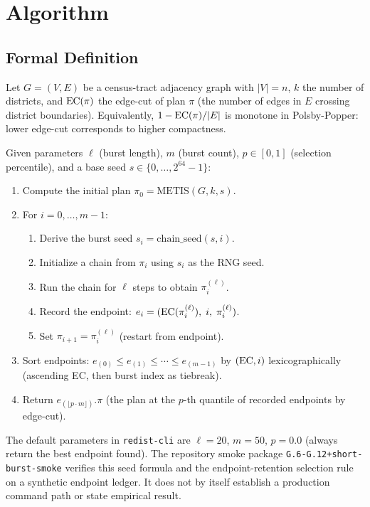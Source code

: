 \section{Algorithm}
\label{sec:algorithm}

\subsection{Formal Definition}

Let $G = (V, E)$ be a census-tract adjacency graph with $|V| = n$,
$k$ the number of districts, and $\mathrm{EC}(\pi)$ the edge-cut of plan $\pi$
(the number of edges in $E$ crossing district boundaries).
Equivalently, $1 - \mathrm{EC}(\pi)/|E|$ is monotone in Polsby-Popper: lower
edge-cut corresponds to higher compactness.

\begin{definition}[\shb{}]
\label{def:short-burst}
Given parameters $\ell$ (burst length), $m$ (burst count), $p \in [0, 1]$
(selection percentile), and a base seed $s \in \{0, \ldots, 2^{64}-1\}$:
\begin{enumerate}
\item Compute the initial plan $\pi_0 = \mathrm{METIS}(G, k, s)$.
\item For $i = 0, \ldots, m-1$:
  \begin{enumerate}
  \item Derive the burst seed $s_i = \mathrm{chain\_seed}(s, i)$.
  \item Initialize a \recom{} chain from $\pi_i$ using $s_i$ as the RNG seed.
  \item Run the chain for $\ell$ steps to obtain $\pi_i^{(\ell)}$.
  \item Record the endpoint: $e_i = (\mathrm{EC}(\pi_i^{(\ell)}),\; i,\; \pi_i^{(\ell)})$.
  \item Set $\pi_{i+1} = \pi_i^{(\ell)}$ (restart from endpoint).
  \end{enumerate}
\item Sort endpoints: $e_{(0)} \leq e_{(1)} \leq \cdots \leq e_{(m-1)}$
      by $(\mathrm{EC}, i)$ lexicographically (ascending EC, then burst index as tiebreak).
\item Return $e_{(\lfloor p \cdot m \rfloor)}.\pi$ (the plan at the $p$-th
      quantile of recorded endpoints by edge-cut).
\end{enumerate}
\end{definition}

The default parameters in \texttt{redist-cli} are $\ell = 20$, $m = 50$,
$p = 0.0$ (always return the best endpoint found).
The repository smoke package \texttt{G.6-G.12+short-burst-smoke} verifies this
seed formula and the endpoint-retention selection rule on a synthetic endpoint
ledger.  It does not by itself establish a production command path or state
empirical result.

